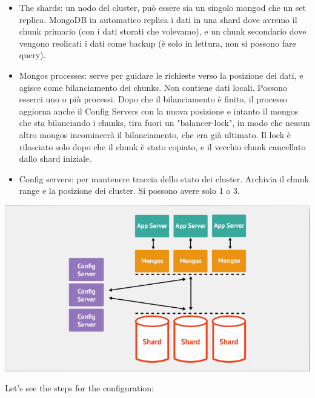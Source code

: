 \documentclass[a4page, 11pt]{article}
\begin{document}
\begin{itemize}[noitemsep]
	\item The shards: un nodo del cluster, può essere sia un singolo mongod che un set replica. MongoDB in automatico replica i dati in una shard dove avremo il chunk primario (con i dati storati che volevamo), e un chunk secondario dove vengono reolicati i dati come backup (è solo in lettura, non si possono fare query).
	\item Mongos processes: serve per guidare le richieste verso la posizione dei dati, e agisce come bilanciamento dei chunks. Non contiene dati locali. Possono esserci uno o più processi. Dopo che il bilanciamento è finito, il processo aggiorna anche il Config Servers con la nuova posizione e intanto il mongos che sta bilanciando i chunks, tira fuori un "balancer-lock", in modo che nessun altro mongos incomincerà il bilanciamento, che era già ultimato. Il lock è rilasciato solo dopo che il chunk è stato copiato, e il vecchio chunk cancellato dallo shard iniziale.
	\item Config servers: per mantenere traccia dello stato dei cluster. Archivia il chunk range e la posizione dei cluster. Si possono avere solo 1 o 3.
\end{itemize}

\begin{center}
	\includegraphics[scale=0.40]{IMAGE6.png}
\end{center}


Let's see the steps for the configuration:
\end{document}
